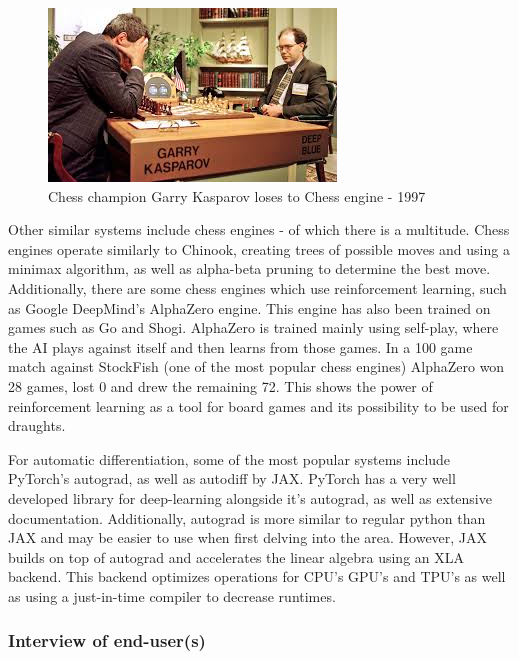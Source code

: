 \documentclass{article}
\makeatletter
\newcommand\subsubsubsection{\@startsection{paragraph}{4}{\z@}{-2.5ex\@plus -1ex \@minus -.25ex}{1.25ex \@plus .25ex}{\normalfont\normalsize\bfseries}}
\makeatother
\begin{document}
    \begin{figure}
        \centering
        \includegraphics[scale=0.7]{download.jpg}
        \caption{Chess champion Garry Kasparov loses to Chess engine - 1997}
    \end{figure}
    Other similar systems include chess engines - of which there is a multitude. Chess engines operate similarly to Chinook, creating trees
    of possible moves and using a minimax algorithm, as well as alpha-beta pruning to determine the best move. Additionally, there are some
    chess engines which use reinforcement learning, such as Google DeepMind's AlphaZero engine. This engine has also been trained on games
    such as Go and Shogi. AlphaZero is trained mainly using self-play, where the AI plays against itself and then learns from those games.
    In a 100 game match against StockFish (one of the most popular chess engines) AlphaZero won 28 games, lost 0 and drew the remaining 72.
    This shows the power of reinforcement learning as a tool for board games and its possibility to be used for draughts.

    For automatic differentiation, some of the most popular systems include PyTorch's autograd, as well as autodiff by JAX. PyTorch has a very
    well developed library for deep-learning alongside it's autograd, as well as extensive documentation. Additionally, autograd is more similar
    to regular python than JAX and may be easier to use when first delving into the area. However, JAX builds on top of autograd and accelerates
    the linear algebra using an XLA backend. This backend optimizes operations for CPU's GPU's and TPU's as well as using a just-in-time compiler
    to decrease runtimes.

    \subsubsection{Interview of end-user(s)}

    \subsubsubsection{Interview of 3rd-party}
\end{document}
